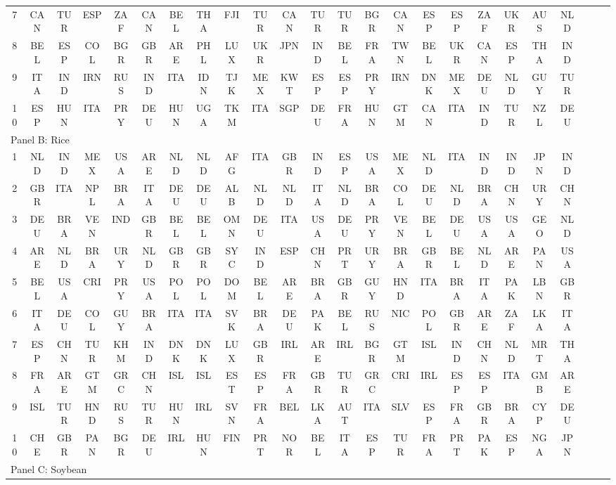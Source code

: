 \documentclass[preprint,3p,times,sort&compress]{elsarticle}
\begin{document}
\begin{table}[!ht]
\begin{tabular}{cccccccccccccccccccccccc}
        7 & CAN & TUR & ESP & ZAF & CAN & BEL & THA & FJI & TUR & CAN & TUR & TUR & BGR & CAN & ESP & ESP & ZAF & UKR & AUS & NLD \\  
        8 & BEL & ESP & COL & BGR & GBR & ARE & PHL & LUX & UKR & JPN & IND & BEL & FRA & TWN & BEL & UKR & CAN & ESP & THA & IND \\  
        9 & ITA & IND & IRN & RUS & IND & ITA & IDN & TJK & MEX & KWT & ESP & ESP & PRY & IRN & DNK & MEX & DEU & NLD & GUY & TUR \\ 
        10 & ESP & HUN & ITA & PRY & DEU & HUN & UGA & TKM & ITA & SGP & DEU & FRA & HUN & GTM & CAN & ITA & IND & TUR & NZL & DEU \\  
        \multicolumn{5}{l}{Panel B: Rice}\\
        1 & NLD & IND & MEX & USA & ARE & NLD & NLD & AFG & ITA & GBR & IND & ESP & USA & MEX & NLD & ITA & IND & IND & JPN & IND \\   
        2 & GBR & ITA & NPL & BRA & ITA & DEU & DEU & ALB & NLD & NLD & ITA & NLD & BRA & COL & DEU & NLD & BRA & CHN & URY & CHN \\ 
        3 & DEU & BRA & VEN & IND & GBR & BEL & BEL & OMN & DEU & ITA & USA & DEU & PRY & VEN & BEL & DEU & USA & USA & GEO & NLD \\  
        4 & ARE & NLD & BRA & URY & NLD & GBR & GBR & SYC & IND & ESP & CHN & PRT & URY & BRA & GBR & BEL & NLD & ARE & PAN & USA \\    
        5 & BEL & USA & CRI & PRY & USA & POL & POL & DOM & BEL & ARE & BRA & GBR & GUY & HND & ITA & BRA & ITA & PAK & LBN & GBR \\   
        6 & ITA & DEU & COL & GUY & BRA & ITA & ITA & SVK & BRA & DEU  & PAK & BEL & RUS & NIC & POL & GBR & ARE & ZAF & LKA & ITA \\    
        7 & ESP & CHN & TUR & KHM & IND & DNK & DNK & LUX & GBR & IRL & ARE & IRL & BGR & GTM & ISL & IND & CHN & NLD & MRT & THA \\   
        8 & FRA & ARE & GTM & GRC & CHN & ISL & ISL & EST & ESP & FRA & GBR & TUR & GRC & CRI & IRL & ESP & ESP & ITA & GMB & ARE \\ 
        9 & ISL & TUR & HND & RUS & TUR & HUN & IRL & SVN & FRA & BEL & LKA & AUT & ITA & SLV & ESP & FRA & GBR & BRA & CYP & DEU \\ 
        10 & CHE & GBR & PAN & BGR & DEU & IRL & HUN & FIN & PRT & NOR  & BEL & ITA & ESP & TUR & FRA & PRT & PAK & ESP & NGA & JPN \\ 
        \multicolumn{5}{l}{Panel C: Soybean}\\

\end{tabular}
\end{table}
\end{document}

